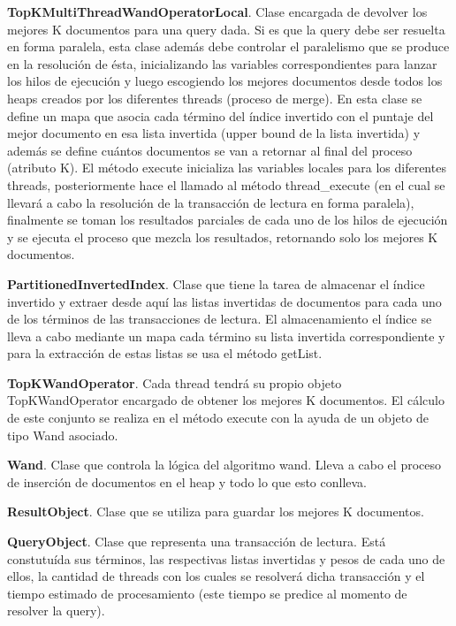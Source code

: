 \begin{list}{}{}
	\item \textbf{TopKMultiThreadWandOperatorLocal}. Clase encargada de devolver los mejores K documentos para una query dada. Si es que la query debe ser resuelta en forma paralela, esta clase además debe controlar el paralelismo que se produce en la resolución de ésta, inicializando las variables correspondientes para lanzar los hilos de ejecución y luego escogiendo los mejores documentos desde todos los heaps creados por los diferentes threads (proceso de merge). En esta clase se define un mapa que asocia cada término del índice invertido con el puntaje del mejor documento en esa lista invertida (upper bound de la lista invertida) y además se define cuántos documentos se van a retornar al final del proceso (atributo K). El método execute inicializa las variables locales para los diferentes threads, posteriormente hace el llamado al método thread_execute (en el cual se llevará a cabo la resolución de la transacción de lectura en forma paralela), finalmente se toman los resultados parciales de cada uno de los hilos de ejecución y se ejecuta el proceso que mezcla los resultados, retornando solo los mejores K documentos. 
	
	\item \textbf{PartitionedInvertedIndex}. Clase que tiene la tarea de almacenar el índice invertido y extraer desde aquí las listas invertidas de documentos para cada uno de los términos de las transacciones de lectura. El almacenamiento el índice se lleva a cabo mediante un mapa cada término su lista invertida correspondiente y para la extracción de estas listas se usa el método getList.
	
	
	\item \textbf{TopKWandOperator}.  Cada thread tendrá su propio objeto TopKWandOperator encargado de obtener los mejores K documentos. El cálculo de este conjunto se realiza en el método execute con la ayuda de un objeto de tipo Wand asociado.
	
	\item \textbf{Wand}. Clase que controla la lógica del algoritmo wand. Lleva a cabo el proceso de inserción de documentos en el heap y todo lo que esto conlleva. 
	
	\item \textbf{ResultObject}. Clase que se utiliza para guardar los mejores K documentos.
	
	\item \textbf{QueryObject}. Clase que representa una transacción de lectura. Está constutuída sus términos,  las respectivas listas invertidas y pesos de cada uno de ellos, la cantidad de threads con los cuales se resolverá dicha transacción y el tiempo estimado de procesamiento (este tiempo se predice al momento de resolver la query).


\end{list}
